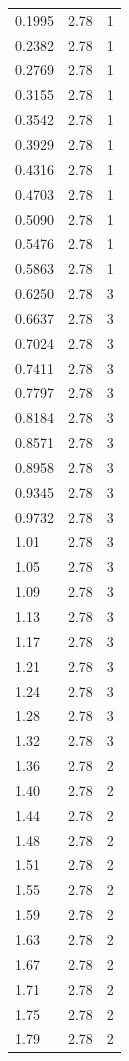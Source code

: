 \begin{longtable}{lrr}
  0.1995 & 2.78 & 1 \\
  0.2382 & 2.78 & 1 \\
  0.2769 & 2.78 & 1 \\
  0.3155 & 2.78 & 1 \\
  0.3542 & 2.78 & 1 \\
  0.3929 & 2.78 & 1 \\
  0.4316 & 2.78 & 1 \\
  0.4703 & 2.78 & 1 \\
  0.5090 & 2.78 & 1 \\
  0.5476 & 2.78 & 1 \\
  0.5863 & 2.78 & 1 \\
  0.6250 & 2.78 & 3 \\
  0.6637 & 2.78 & 3 \\
  0.7024 & 2.78 & 3 \\
  0.7411 & 2.78 & 3 \\
  0.7797 & 2.78 & 3 \\
  0.8184 & 2.78 & 3 \\
  0.8571 & 2.78 & 3 \\
  0.8958 & 2.78 & 3 \\
  0.9345 & 2.78 & 3 \\
  0.9732 & 2.78 & 3 \\
  1.01 & 2.78 & 3 \\
  1.05 & 2.78 & 3 \\
  1.09 & 2.78 & 3 \\
  1.13 & 2.78 & 3 \\
  1.17 & 2.78 & 3 \\
  1.21 & 2.78 & 3 \\
  1.24 & 2.78 & 3 \\
  1.28 & 2.78 & 3 \\
  1.32 & 2.78 & 3 \\
  1.36 & 2.78 & 2 \\
  1.40 & 2.78 & 2 \\
  1.44 & 2.78 & 2 \\
  1.48 & 2.78 & 2 \\
  1.51 & 2.78 & 2 \\
  1.55 & 2.78 & 2 \\
  1.59 & 2.78 & 2 \\
  1.63 & 2.78 & 2 \\
  1.67 & 2.78 & 2 \\
  1.71 & 2.78 & 2 \\
  1.75 & 2.78 & 2 \\
  1.79 & 2.78 & 2 \\

\end{longtable}
